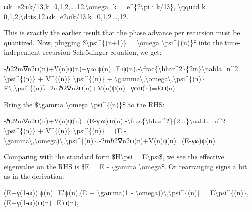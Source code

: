 \documentclass[
]{article}
\begin{document}
{ωk=e2πik/13,k=0,1,2,\ldots,12.\textbackslash omega\_k =
e\^{}\{2\textbackslash pi i k/13\}, \textbackslash qquad k =
0,1,2,\textbackslash dots,12.ωk\hspace{0pt}=e2πik/13,k=0,1,2,\ldots,12.\hspace{0pt}

This is exactly the earlier result that the phase advance per recursion
must be quantized. Now, plugging \$\textbackslash psi\^{}\{(n+1)\} =
\textbackslash omega \textbackslash psi\^{}\{(n)\}\$ into the
time-independent recursion Schrödinger equation, we get:

-ℏ22m∇n2ψ(n)+V(n)ψ(n)+γ ω ψ(n)=E ψ(n).-\textbackslash frac\{\textbackslash hbar\^{}2\}\{2m\}\textbackslash nabla\_n\^{}2
\textbackslash psi\^{}\{(n)\} + V\^{}\{(n)\}
\textbackslash psi\^{}\{(n)\} +
\textbackslash gamma\textbackslash,\textbackslash omega\textbackslash,\textbackslash psi\^{}\{(n)\}
=
E\textbackslash,\textbackslash psi\^{}\{(n)\}.-2mℏ2\hspace{0pt}∇n2\hspace{0pt}ψ(n)+V(n)ψ(n)+γωψ(n)=Eψ(n).

Bring the \$\textbackslash gamma \textbackslash omega
\textbackslash psi\^{}\{(n)\}\$ to the RHS:

-ℏ22m∇n2ψ(n)+V(n)ψ(n)=(E-γ ω) ψ(n).-\textbackslash frac\{\textbackslash hbar\^{}2\}\{2m\}\textbackslash nabla\_n\^{}2
\textbackslash psi\^{}\{(n)\} + V\^{}\{(n)\}
\textbackslash psi\^{}\{(n)\} = (E -
\textbackslash gamma\textbackslash,\textbackslash omega)\textbackslash,\textbackslash psi\^{}\{(n)\}.-2mℏ2\hspace{0pt}∇n2\hspace{0pt}ψ(n)+V(n)ψ(n)=(E-γω)ψ(n).\hspace{0pt}

Comparing with the standard form \$H\textbackslash psi =
E\textquotesingle\textbackslash psi\$, we see the effective eigenvalue
on the RHS is \$E\textquotesingle{} = E - \textbackslash gamma
\textbackslash omega\$. Or rearranging signs a bit as in the derivation:

(E+γ(1-ω)) ψ(n)=E′ψ(n),(E + \textbackslash gamma(1 -
\textbackslash omega))\textbackslash,\textbackslash psi\^{}\{(n)\} =
E\textquotesingle\textbackslash psi\^{}\{(n)\},(E+γ(1-ω))ψ(n)=E′ψ(n),

}
\end{document}

